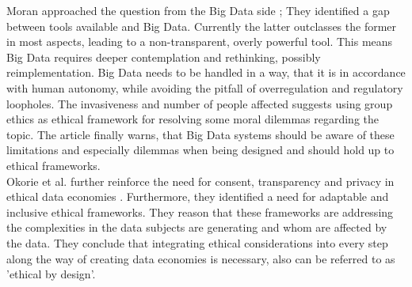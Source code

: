 \documentclass[a4paper,11pt]{report} %
\theoremstyle{change}
\theoremstyle{theoremstyle}
\begin{document}
Moran approached the question from the Big Data side \cite{moran2022towards}; They identified a gap between tools available and Big Data. Currently the latter outclasses the former in most aspects, leading to a non-transparent, overly powerful tool. This means Big Data requires deeper contemplation and rethinking, possibly reimplementation. Big Data needs to be handled in a way, that it is in accordance with human autonomy, while avoiding the pitfall of overregulation and regulatory loopholes. The invasiveness and number of people affected suggests using group ethics as ethical framework for resolving some moral dilemmas regarding the topic. The article finally warns, that Big Data systems should be aware of these limitations and especially dilemmas when being designed and should hold up to ethical frameworks.\\

Okorie et al. further reinforce the need for consent, transparency and privacy in ethical data economies \cite{okorie2024ethical}. Furthermore, they identified a need for adaptable and inclusive ethical frameworks. They reason that these frameworks are addressing the complexities in the data subjects are generating and whom are affected by the data. They conclude that integrating ethical considerations into every step along the way of creating data economies is necessary, also can be referred to as 'ethical by design'.\\
\end{document}

